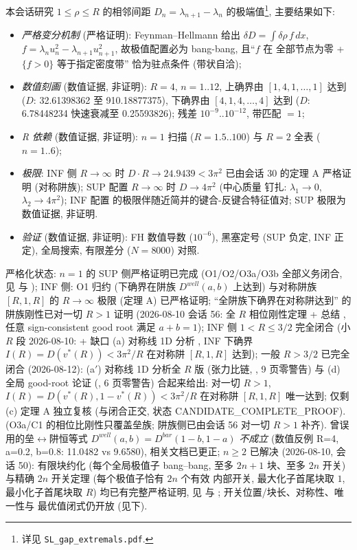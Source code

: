 \documentclass[UTF8]{ctexart}
\begin{document}
本会话研究 $1\le\rho\le R$ 的相邻间距
$D_n=\lambda_{n+1}-\lambda_n$ 的极端值\footnote{详见
\texttt{SL\_gap\_extremals.pdf}.}, 主要结果如下:
\begin{itemize}
	\item \emph{严格变分机制} (严格证明): Feynman--Hellmann 给出
		$\delta D = \int\delta\rho\,f\,dx$, $f = \lambda_n u_n^2 -
		\lambda_{n+1}u_{n+1}^2$, 故极值配置必为 bang-bang, 且``$f$ 在
		全部节点为零 + $\{f>0\}$ 等于指定密度带'' 恰为驻点条件
		(带状自洽);
	\item \emph{数值刻画} (数值证据, 非证明): $R=4$, $n=1..12$, 上确界由 $[1,4,1,\dots,1]$
		达到 ($D$: 32.61398362 至 910.18877375), 下确界由
		$[4,1,4,\dots,4]$ 达到 ($D$: 6.78448234 快速衰减至 0.25593826);
		残差 $10^{-9}..10^{-12}$, 带匹配 $= 1$;
	\item \emph{R 依赖} (数值证据, 非证明): $n=1$ 扫描 ($R=1.5..100$) 与 $R=2$ 全表
		($n=1..6$);
	\item \emph{极限}: INF 侧 $R\to\infty$ 时 $D\cdot R \to 24.9439 < 3\pi^2$
		已由会话 30 的定理 A 严格证明 (对称阱族); SUP 配置 $R\to\infty$ 时
		$D \to 4\pi^2$ (中心质量
		钉扎: $\lambda_1\to0$, $\lambda_2\to4\pi^2$); INF 配置
		的极限伴随近简并的键合-反键合特征值对; SUP 极限为数值证据, 非证明.
	\item \emph{验证} (数值证据, 非证明): FH 数值导数 ($10^{-6}$), 黑塞定号 (SUP 负定,
		INF 正定), 全局搜索, 有限差分 ($N=8000$) 对照.
\end{itemize}
严格化状态: $n=1$ 的 SUP 侧严格证明已完成 (O1/O2/O3a/O3b 全部义务闭合, 见
 与 );
INF 侧: O1 归约 (下确界在阱族 $D^{well}(a,b)$ 上达到) 与对称阱族 $[R,1,R]$ 的
$R\to\infty$ 极限 (定理 A) 已严格证明; ``全阱族下确界在对称阱达到'' 的阱族刚性已对一切 $R>1$ 证明 (2026-08-10 会话 56:
全 $R$ 相位刚性定理  + 总结
, 任意 sign-consistent good root 满足 $a+b=1$);
INF 侧 $1<R\le3/2$ 完全闭合 (小 $R$ 段 2026-08-10:  +
缺口 (a) 对称线 1D 分析 , INF 下确界 $I(R)=D(v^*(R))<3\pi^2/R$ 在对称阱
$[R,1,R]$ 达到); 一般 $R>3/2$ 已完全闭合 (2026-08-12): (a$'$) 对称线 1D 分析全 $R$ 版
(张力比链, , 9 页零警告) 与 (d) 全局
good-root 论证 (, 6 页零警告) 合起来给出:
对一切 $R>1$, $I(R)=D(v^*(R),1-v^*(R))<3\pi^2/R$ 在对称阱 $[R,1,R]$ 唯一达到;
仅剩 (c) 定理 A 独立复核 (与闭合正交, 状态 CANDIDATE\_COMPLETE\_PROOF).  (O3a/C1 的相位比刚性只覆盖垒族; 阱族侧已由会话 56 对一切 $R>1$ 补齐). 曾误用的垒$\leftrightarrow$阱恒等式
$D^{well}(a,b)=D^{bar}(1-b,1-a)$ \emph{不成立} (数值反例 R=4, a=0.2, b=0.8:
11.0482 vs 9.6580), 相关文档已更正;
$n\ge2$ 已解决 (2026-08-10, 会话 50): 有限块约化 (每个全局极值子 bang--bang,
至多 $2n+1$ 块、至多 $2n$ 开关) 与精确 $2n$ 开关定理 (每个极值子恰有 $2n$ 个有效
内部开关, 最大化子首尾块取 $1$, 最小化子首尾块取 $R$) 均已有完整严格证明, 见
 与
; 开关位置/块长、对称性、唯一性与
最优值闭式仍开放 (见下).
\end{document}

